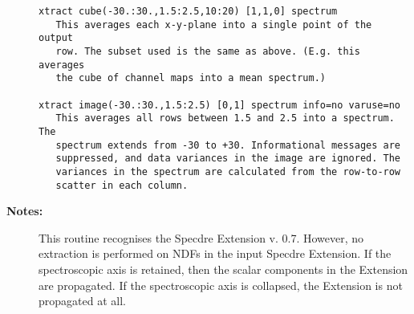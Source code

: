 \begin{description}
\begin{verbatim}
xtract cube(-30.:30.,1.5:2.5,10:20) [1,1,0] spectrum
   This averages each x-y-plane into a single point of the output
   row. The subset used is the same as above. (E.g. this averages
   the cube of channel maps into a mean spectrum.)

xtract image(-30.:30.,1.5:2.5) [0,1] spectrum info=no varuse=no
   This averages all rows between 1.5 and 2.5 into a spectrum. The
   spectrum extends from -30 to +30. Informational messages are
   suppressed, and data variances in the image are ignored. The
   variances in the spectrum are calculated from the row-to-row
   scatter in each column.
\end{verbatim}

\item [{\bf Notes:}]
This routine recognises the Specdre Extension v. 0.7. However, no
extraction is performed on NDFs in the input Specdre Extension. If
the spectroscopic axis is retained, then the scalar components in
the Extension are propagated. If the spectroscopic axis is
collapsed, the Extension is not propagated at all.
\end{description}
